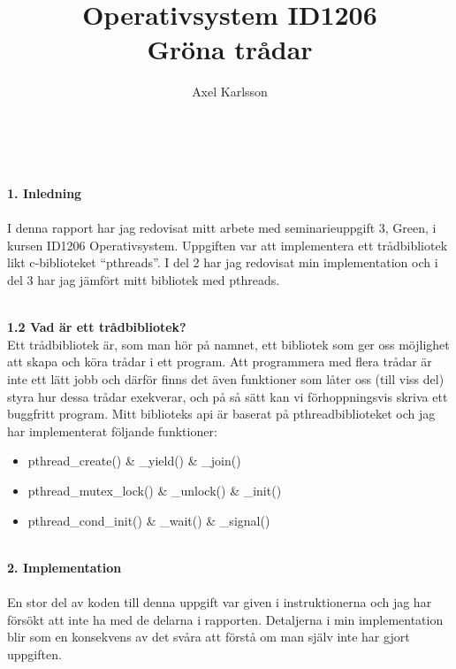 \documentclass[a4paper,10pt]{article}
\title{\textbf{Operativsystem ID1206} \\ 
\textbf{Gröna trådar}}
\author{Axel Karlsson}
\begin{document}
\maketitle
\textbf
    {\\\\1. Inledning\\\\}
I denna rapport har jag redovisat mitt arbete med seminarieuppgift 3, Green, i kursen ID1206 Operativsystem. Uppgiften var att implementera ett trådbibliotek likt c-biblioteket ``pthreads''.  I del 2 har jag redovisat min implementation och i del 3 har jag jämfört mitt bibliotek med pthreads.

\maketitle
\textbf
{\\1.2 Vad är ett trådbibliotek?\\}
Ett trådbibliotek är, som man hör på namnet, ett bibliotek som ger oss möjlighet att skapa och köra trådar i ett program. Att programmera med flera trådar är inte ett lätt jobb och därför finns det även funktioner som låter oss (till viss del) styra hur dessa trådar exekverar, och på så sätt kan vi förhoppningsvis skriva ett buggfritt program. Mitt biblioteks api är baserat på pthreadbiblioteket och jag har implementerat följande funktioner:
\begin{itemize}
  \item pthread\_create() \& \_yield() \& \_join()
  \item pthread\_mutex\_lock() \& \_unlock() \& \_init()
  \item pthread\_cond\_init() \& \_wait() \& \_signal()
\end{itemize}

\maketitle
\textbf
    {\\2. Implementation\\\\}
    En stor del av koden till denna uppgift var given i instruktionerna och jag har försökt att inte ha med de delarna i rapporten. Detaljerna i min implementation blir som en konsekvens av det svåra att förstå om man själv inte har gjort uppgiften.
    
\end{document}

